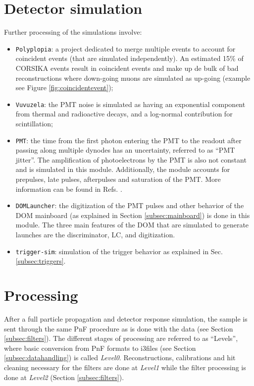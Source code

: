 \section{Detector simulation}
Further processing of the simulations involve:
\begin{itemize}
\item \texttt{Polyplopia}: a project dedicated to merge multiple events to account for coincident events (that are simulated independently). An estimated 15\% of CORSIKA events result in coincident events and make up de bulk of bad reconstructions where down-going muons are simulated as up-going (example see Figure \ref{fig:coincidentevent});
\item \texttt{Vuvuzela}: the PMT noise is simulated as having an exponential component from  thermal and radioactive decays, and a log-normal contribution for scintillation;
\item \texttt{PMT}: the time from the first photon entering the PMT to the readout after passing along multiple dynodes has an uncertainty, referred to as ``PMT jitter''. The amplification of photoelectrons by the PMT is also not constant and is simulated in this module. Additionally, the module accounts for prepulses, late pulses, afterpulses and saturation of the PMT. More information can be found in Refs. \cite{Abbasi:2010vc,Ma:2009aw}.
\item \texttt{DOMLauncher}: the digitization of the PMT pulses and other behavior of the DOM mainboard (as explained in Section \ref{subsec:mainboard}) is done in this module. The three main features of the DOM that are simulated to generate launches are the discriminator, LC, and digitization.
\item \texttt{trigger-sim}: simulation of the trigger behavior as explained in Sec. \ref{subsec:triggers}.
\end{itemize}

\section{Processing}
\label{sec:processing}
After a full particle propagation and detector response simulation, the sample is sent through the same PnF procedure as is done with the data (see Section \ref{subsec:filters}). The different stages of processing are referred to as ``Levels'', where basic conversion from PnF formats to i3files (see Section \ref{subsec:datahandling}) is called \textit{Level0}. Reconstructions, calibrations and hit cleaning necessary for the filters are done at \textit{Level1} while the filter processing is done at \textit{Level2} (Section \ref{subsec:filters}).

